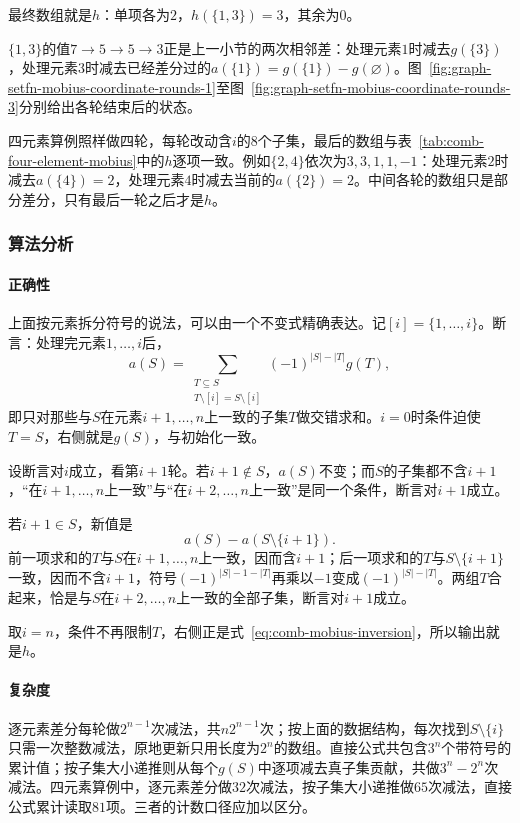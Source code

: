 最终数组就是$h$：单项各为$2$，$h(\{1,3\})=3$，其余为$0$。

$\{1,3\}$的值$7\to5\to5\to3$正是上一小节的两次相邻差：处理元素$1$时减去$g(\{3\})$，处理元素$3$时减去已经差分过的$a(\{1\})=g(\{1\})-g(\varnothing)$。图~\ref{fig:graph-setfn-mobius-coordinate-rounds-1}至图~\ref{fig:graph-setfn-mobius-coordinate-rounds-3}分别给出各轮结束后的状态。


四元素算例照样做四轮，每轮改动含$i$的$8$个子集，最后的数组与表~\ref{tab:comb-four-element-mobius}中的$h$逐项一致。例如$\{2,4\}$依次为$3,3,1,1,-1$：处理元素$2$时减去$a(\{4\})=2$，处理元素$4$时减去当前的$a(\{2\})=2$。中间各轮的数组只是部分差分，只有最后一轮之后才是$h$。

\subsubsection{算法分析}

\paragraph{正确性}
上面按元素拆分符号的说法，可以由一个不变式精确表达。记$[i]=\{1,\ldots,i\}$。断言：处理完元素$1,\ldots,i$后，
\[
  a(S)=\sum_{\substack{T\subseteq S\\ T\setminus[i]=S\setminus[i]}}(-1)^{|S|-|T|}g(T),
\]
即只对那些与$S$在元素$i+1,\ldots,n$上一致的子集$T$做交错求和。$i=0$时条件迫使$T=S$，右侧就是$g(S)$，与初始化一致。

设断言对$i$成立，看第$i+1$轮。若$i+1\notin S$，$a(S)$不变；而$S$的子集都不含$i+1$，“在$i+1,\ldots,n$上一致”与“在$i+2,\ldots,n$上一致”是同一个条件，断言对$i+1$成立。

若$i+1\in S$，新值是
\[
  a(S)-a(S\setminus\{i+1\}).
\]
前一项求和的$T$与$S$在$i+1,\ldots,n$上一致，因而含$i+1$；后一项求和的$T$与$S\setminus\{i+1\}$一致，因而不含$i+1$，符号$(-1)^{|S|-1-|T|}$再乘以$-1$变成$(-1)^{|S|-|T|}$。两组$T$合起来，恰是与$S$在$i+2,\ldots,n$上一致的全部子集，断言对$i+1$成立。

取$i=n$，条件不再限制$T$，右侧正是式~\eqref{eq:comb-mobius-inversion}，所以输出就是$h$。

\paragraph{复杂度}
逐元素差分每轮做$2^{n-1}$次减法，共$n2^{n-1}$次；按上面的数据结构，每次找到$S\setminus\{i\}$只需一次整数减法，原地更新只用长度为$2^n$的数组。直接公式共包含$3^n$个带符号的累计值；按子集大小递推则从每个$g(S)$中逐项减去真子集贡献，共做$3^n-2^n$次减法。四元素算例中，逐元素差分做$32$次减法，按子集大小递推做$65$次减法，直接公式累计读取$81$项。三者的计数口径应加以区分。

